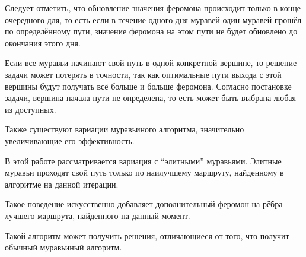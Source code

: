 Следует отметить, что обновление значения феромона происходит только в конце очередного для, то есть если в течение одного дня муравей один муравей прошёл по определённому пути, значение феромона на этом пути не будет обновлено до окончания этого дня.

Если все муравьи начинают свой путь в одной конкретной вершине, то решение задачи может потерять в точности, так как оптимальные пути выхода с этой вершины будут получать всё больше и больше феромона. Согласно постановке задачи, вершина начала пути не определена, то есть может быть выбрана любая из доступных.

Также существуют вариации муравьиного алгоритма, значительно увеличивающие его эффективность.

В этой работе рассматривается вариация с ``элитными'' муравьями. Элитные муравьи проходят свой путь только по наилучшему маршруту, найденному в алгоритме на данной итерации.

Такое поведение искусственно добавляет дополнительный феромон на рёбра лучшего маршрута, найденного на данный момент.

Такой алгоритм может получить решения, отличающиеся от того, что получит обычный муравьиный алгоритм.
